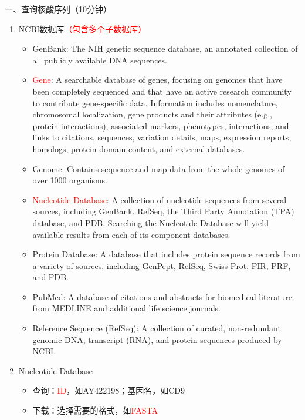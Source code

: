 \documentclass{TIJMUjiaoanSY}
\begin{document}


\firstTail


\newpage
\otherHeader

\noindent
一、查询核酸序列（10分钟）
\begin{enumerate}
  \item NCBI数据库\textcolor{red}{（包含多个子数据库）}
    \begin{itemize}
      \item GenBank: The NIH genetic sequence database, an annotated collection of all publicly available DNA sequences.
      \item \textcolor{red}{Gene}: A searchable database of genes, focusing on genomes that have been completely sequenced and that have an active research community to contribute gene-specific data. Information includes nomenclature, chromosomal localization, gene products and their attributes (e.g., protein interactions), associated markers, phenotypes, interactions, and links to citations, sequences, variation details, maps, expression reports, homologs, protein domain content, and external databases.
      \item Genome: Contains sequence and map data from the whole genomes of over 1000 organisms. 
      \item \textcolor{red}{Nucleotide Database}: A collection of nucleotide sequences from several sources, including GenBank, RefSeq, the Third Party Annotation (TPA) database, and PDB. Searching the Nucleotide Database will yield available results from each of its component databases.
      \item  Protein Database: A database that includes protein sequence records from a variety of sources, including GenPept, RefSeq, Swiss-Prot, PIR, PRF, and PDB.
      \item  PubMed: A database of citations and abstracts for biomedical literature from MEDLINE and additional life science journals. 
      \item  Reference Sequence (RefSeq): A collection of curated, non-redundant genomic DNA, transcript (RNA), and protein sequences produced by NCBI.
    \end{itemize}
  \item Nucleotide Database
    \begin{itemize}
      \item 查询：\textcolor{red}{ID}，如AY422198；基因名，如CD9
      \item 下载：选择需要的格式，如\textcolor{red}{FASTA}
    \end{itemize}
\end{enumerate}
\end{document}
